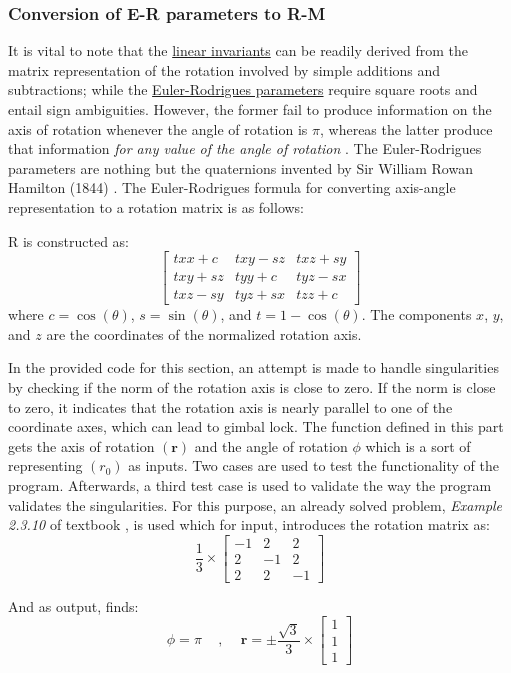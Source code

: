 \documentclass[conference]{IEEEtran}
\begin{document}
\subsubsection{Conversion of E-R parameters to R-M}
It is vital to note that the \underline{linear invariants} can be readily derived from the matrix representation of the rotation involved by simple additions and subtractions; while the \underline{Euler-Rodrigues parameters} require square roots and entail sign ambiguities. However, the former fail to produce information on the axis of rotation whenever the angle of rotation is $\pi$, whereas the latter produce that information \textit{for any value of the angle of rotation} \cite{b1}.
The Euler-Rodrigues parameters are nothing but the quaternions invented by Sir William Rowan Hamilton (1844) \cite{b13}. The Euler-Rodrigues formula for converting axis-angle representation to a rotation matrix is as follows:

R is constructed as:
$$
\begin{bmatrix}
    txx + c & txy - sz & txz + sy \\
    txy + sz & tyy + c & tyz - sx \\
    txz - sy & tyz + sx & tzz + c
\end{bmatrix}
$$
where \(c = \cos(\theta)\), \(s = \sin(\theta)\), and \(t = 1 - \cos(\theta)\). The components \(x\), \(y\), and \(z\) are the coordinates of the normalized rotation axis.

In the provided code for this section, an attempt is made to handle singularities by checking if the norm of the rotation axis is close to zero. If the norm is close to zero, it indicates that the rotation axis is nearly parallel to one of the coordinate axes, which can lead to gimbal lock. The function defined in this part gets the axis of rotation $(\mathbf{r})$ and the angle of rotation $\phi$ which is a sort of representing $(r_0)$ as inputs. Two cases are used to test the functionality of the program. Afterwards, a third test case is used to validate the way the program validates the singularities. For this purpose, an already solved problem, \textit{Example 2.3.10} of textbook \cite{b1}, is used which for input, introduces the rotation matrix as:
$$
\frac{1}{3} \times
\begin{bmatrix}
    -1 & 2 & 2 \\
    2 & -1 & 2 \\
    2 & 2 & -1
\end{bmatrix}
$$

And as output, finds:
$$
\phi = \pi \, \quad , \quad \,
\mathbf{r} = \pm \frac{\sqrt{3}}{3} \times
\begin{bmatrix}
    1 \\
    1 \\
    1
\end{bmatrix}
$$
\end{document}
